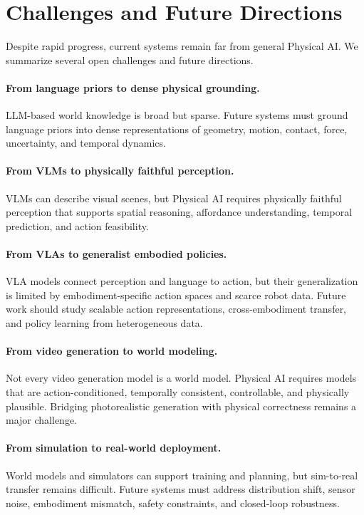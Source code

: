 \section{Challenges and Future Directions}
\label{sec:challenges}

Despite rapid progress, current systems remain far from general Physical AI. 
We summarize several open challenges and future directions.

\paragraph{From language priors to dense physical grounding.}
LLM-based world knowledge is broad but sparse. 
Future systems must ground language priors into dense representations of geometry, motion, contact, force, uncertainty, and temporal dynamics.

\paragraph{From VLMs to physically faithful perception.}
VLMs can describe visual scenes, but Physical AI requires physically faithful perception that supports spatial reasoning, affordance understanding, temporal prediction, and action feasibility.

\paragraph{From VLAs to generalist embodied policies.}
VLA models connect perception and language to action, but their generalization is limited by embodiment-specific action spaces and scarce robot data. 
Future work should study scalable action representations, cross-embodiment transfer, and policy learning from heterogeneous data.

\paragraph{From video generation to world modeling.}
Not every video generation model is a world model. 
Physical AI requires models that are action-conditioned, temporally consistent, controllable, and physically plausible. 
Bridging photorealistic generation with physical correctness remains a major challenge.

\paragraph{From simulation to real-world deployment.}
World models and simulators can support training and planning, but sim-to-real transfer remains difficult. 
Future systems must address distribution shift, sensor noise, embodiment mismatch, safety constraints, and closed-loop robustness.

